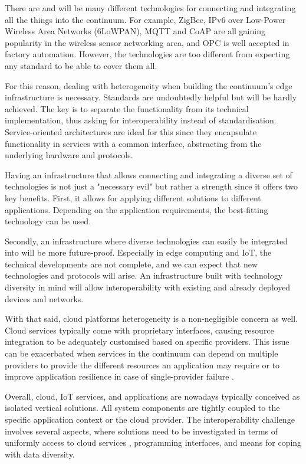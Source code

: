 There are and will be many different technologies for connecting and integrating all the things into the continuum. For example, ZigBee, IPv6 over Low-Power Wireless Area Networks (6LoWPAN), MQTT and CoAP \cite{mqtt-coap-amqp-http} are all gaining popularity in the wireless sensor networking area, and OPC \cite{rest-opc} is well accepted in factory automation. However, the technologies are too different from expecting any standard to be able to cover them all.

For this reason, dealing with heterogeneity when building the continuum's edge infrastructure is necessary. Standards are undoubtedly helpful but will be hardly achieved. The key is to separate the functionality from its technical implementation, thus asking for interoperability instead of standardisation. Service-oriented architectures are ideal for this since they encapsulate functionality in services with a common interface, abstracting from the underlying hardware and protocols.

Having an infrastructure that allows connecting and integrating a diverse set of technologies is not just a "necessary evil" but rather a strength since it offers two key benefits. First, it allows for applying different solutions to different applications. Depending on the application requirements, the best-fitting technology can be used.

Secondly, an infrastructure where diverse technologies can easily be integrated into will be more future-proof. Especially in edge computing and IoT, the technical developments are not complete, and we can expect that new technologies and protocols will arise. An infrastructure built with technology diversity in mind will allow interoperability with existing and already deployed devices and networks.

With that said, cloud platforms heterogeneity is a non-negligible concern as well. Cloud services typically come with proprietary interfaces, causing resource integration to be adequately customised based on specific providers. This issue can be exacerbated when services in the continuum can depend on multiple providers to provide the different resources an application may require or to improve application resilience in case of single-provider failure \cite{inter-cloud}.

Overall, cloud, IoT services, and applications are nowadays typically conceived as isolated vertical solutions. All system components are tightly coupled to the specific application context or the cloud provider. The interoperability challenge involves several aspects, where solutions need to be investigated in terms of uniformly access to cloud services \cite{inter-cloud}, programming interfaces, and means for coping with data diversity.

